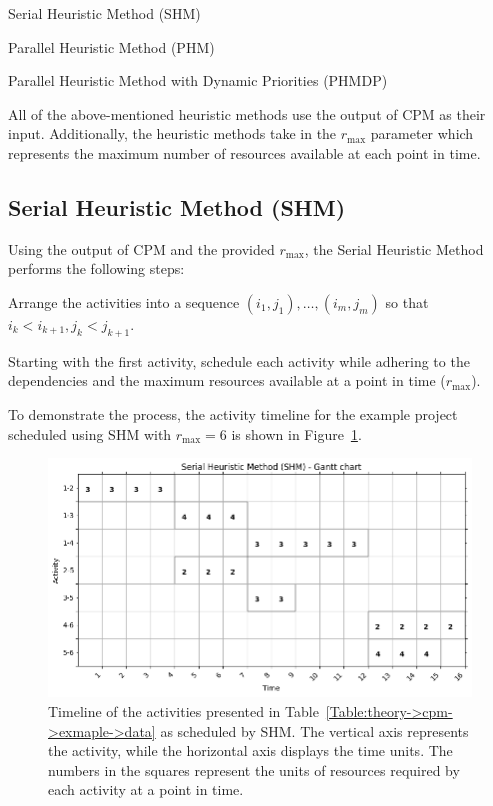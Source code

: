 \begin{tight_itemize}
	\item Serial Heuristic Method (SHM)
	\item Parallel Heuristic Method (PHM)
	\item Parallel Heuristic Method with Dynamic Priorities (PHMDP)
\end{tight_itemize}

All of the above-mentioned heuristic methods use the output of CPM as their input.
Additionally, the heuristic methods take in the $r_\mathrm{max}$ parameter which represents the maximum number of resources available at each point in time.



\subsection{Serial Heuristic Method (SHM)}
Using the output of CPM and the provided $r_\mathrm{max}$, the Serial Heuristic Method performs the following steps:

\begin{tight_enumerate}
	\item Arrange the activities into a sequence $\left(i_1, j_1\right),  \ldots, \left(i_m, j_m\right)$ so that $i_k < i_{k+1}, j_k < j_{k+1}$.
	\item Starting with the first activity, schedule each activity while adhering to the dependencies and the maximum resources available at a point in time ($r_\mathrm{max}$).
\end{tight_enumerate}

To demonstrate the process, the activity timeline for the example project scheduled using SHM with $r_\mathrm{max} = 6$ is shown in Figure~\ref{Figure:theory->shm->example->timeline}.

\begin{figure}[ht!]
	\centering
	\includegraphics[width=\linewidth]{images/theory/shm_example_project.png}
	\caption{Timeline of the activities presented in Table~\ref{Table:theory->cpm->exmaple->data} as scheduled by SHM.
		The vertical axis represents the activity, while the horizontal axis displays the time units.
		The numbers in the squares represent the units of resources required by each activity at a point in time.
	}
	\label{Figure:theory->shm->example->timeline}
\end{figure}

